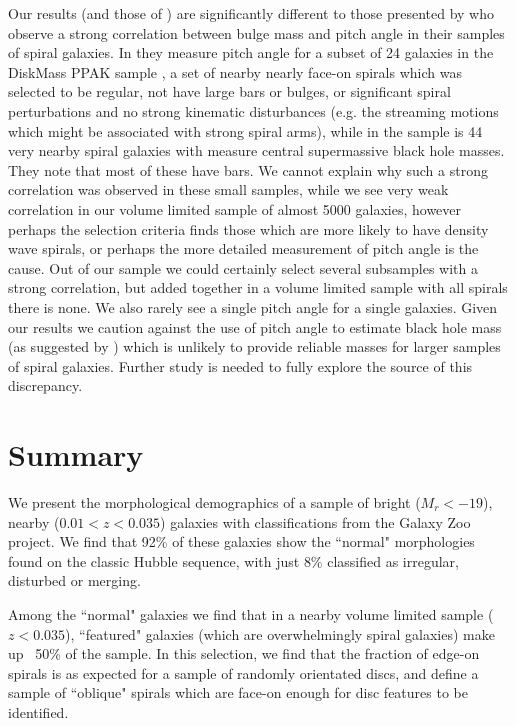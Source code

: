\documentclass[usenatbib]{mn2e}
\begin{document}
 Our results (and those of \citealt{Hart2017a,Hart2017b,Hart2018}) are significantly different to those presented by \citet{Davis2015,Davis2017} who observe a strong correlation between bulge mass and pitch angle in their samples of spiral galaxies. In \citet{Davis2015} they measure pitch angle for a subset of 24 galaxies in the DiskMass PPAK sample \citep{Bershady2010,Martinsson2013}, a set of nearby nearly face-on spirals which was selected to be regular, not have large bars or bulges, or significant spiral perturbations and no strong kinematic disturbances (e.g. the streaming motions which might be associated with strong spiral arms), while in \citet{Davis2017} the sample is 44 very nearby spiral galaxies with measure central supermassive black hole masses. They note that most of these have bars. We cannot explain why such a strong correlation was observed in these small samples, while we see very weak correlation in our volume limited sample of almost 5000 galaxies, however perhaps the selection criteria finds those which are more likely to have density wave spirals, or perhaps the more detailed measurement of pitch angle is the cause. Out of our sample we could certainly select several subsamples with a strong correlation, but added together in a volume limited sample with all spirals there is none. We also rarely see a single pitch angle for a single galaxies. Given our results we caution against the use of pitch angle to estimate black hole mass (as suggested by \citealt{Davis2017}) which is unlikely to provide reliable masses for larger samples of spiral galaxies. Further study is needed to fully explore the source of this discrepancy.


\section{Summary}

We present the morphological demographics of a sample of bright ($M_r <-19$), nearby ($0.01<z<0.035$) galaxies with classifications from the Galaxy Zoo project. We find that {92\%} of these galaxies show the ``normal" morphologies found on the classic Hubble sequence, with just {8\%} classified as irregular, disturbed or merging. 

Among the ``normal" galaxies we find that in a nearby volume limited sample ($z<0.035$), ``featured" galaxies (which are overwhelmingly spiral galaxies) make up ~50\% of the sample. In this selection, we find that the fraction of edge-on spirals is as expected for a sample of randomly orientated discs, and define a sample of ``oblique" spirals which are face-on enough for disc features to be identified. 
\end{document}
